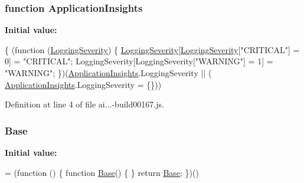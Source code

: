 \subsubsection[{\texorpdfstring{Application\+Insights}{ApplicationInsights}}]{\setlength{\rightskip}{0pt plus 5cm}function Application\+Insights}\hypertarget{obj_2_release_2_package_2_package_tmp_2_scripts_2ai_80_822_89-build00167_8js_aa415ef4f8cdd699689ef4b61db7656d8}{}\label{obj_2_release_2_package_2_package_tmp_2_scripts_2ai_80_822_89-build00167_8js_aa415ef4f8cdd699689ef4b61db7656d8}
{\bfseries Initial value\+:}
\begin{DoxyCode}
\{
        (\textcolor{keyword}{function} (\hyperlink{obj_2_release_2_package_2_package_tmp_2_scripts_2ai_80_822_89-build00167_8js_a7c9dc87e469261dd3cdf56090107bebc}{LoggingSeverity}) \{
            \hyperlink{obj_2_release_2_package_2_package_tmp_2_scripts_2ai_80_822_89-build00167_8js_a7c9dc87e469261dd3cdf56090107bebc}{LoggingSeverity}[\hyperlink{obj_2_release_2_package_2_package_tmp_2_scripts_2ai_80_822_89-build00167_8js_a7c9dc87e469261dd3cdf56090107bebc}{LoggingSeverity}[\textcolor{stringliteral}{"CRITICAL"}] = 0] = \textcolor{stringliteral}{"CRITICAL"};
            LoggingSeverity[LoggingSeverity[\textcolor{stringliteral}{"WARNING"}] = 1] = \textcolor{stringliteral}{"WARNING"};
        \})(\hyperlink{obj_2_release_2_package_2_package_tmp_2_scripts_2ai_80_822_89-build00167_8js_aa415ef4f8cdd699689ef4b61db7656d8}{ApplicationInsights}.LoggingSeverity || (
      \hyperlink{obj_2_release_2_package_2_package_tmp_2_scripts_2ai_80_822_89-build00167_8js_aa415ef4f8cdd699689ef4b61db7656d8}{ApplicationInsights}.LoggingSeverity = \{\}))
\end{DoxyCode}


Definition at line 4 of file ai...-\/build00167.\+js.

\subsubsection[{\texorpdfstring{Base}{Base}}]{ Base}\hypertarget{obj_2_release_2_package_2_package_tmp_2_scripts_2ai_80_822_89-build00167_8js_abc90faad356138d0991872b4e65ecf20}{}\label{obj_2_release_2_package_2_package_tmp_2_scripts_2ai_80_822_89-build00167_8js_abc90faad356138d0991872b4e65ecf20}
{\bfseries Initial value\+:}
\begin{DoxyCode}
= (\textcolor{keyword}{function} () \{
            \textcolor{keyword}{function} \hyperlink{obj_2_release_2_package_2_package_tmp_2_scripts_2ai_80_822_89-build00167_8js_abc90faad356138d0991872b4e65ecf20}{Base}() \{
            \}
            \textcolor{keywordflow}{return} \hyperlink{obj_2_release_2_package_2_package_tmp_2_scripts_2ai_80_822_89-build00167_8js_abc90faad356138d0991872b4e65ecf20}{Base};
        \})()
\end{DoxyCode}


